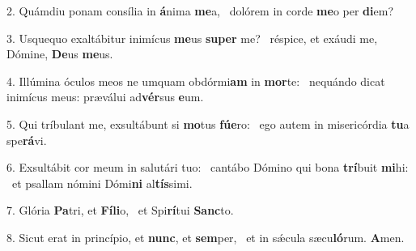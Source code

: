 2. Quámdiu ponam consília in \textbf{á}nima \textbf{me}a, \ast\  dolórem in corde \textbf{me}o per \textbf{di}em?\

3. Usquequo exaltábitur inimícus \textbf{me}us \textbf{su}\textbf{per} me? \ast\  réspice, et exáudi me, Dómine, \textbf{De}us \textbf{me}us.\

4. Illúmina óculos meos ne umquam obdórmi\textbf{am} in \textbf{mor}te: \ast\  nequándo dicat inimícus meus: præválui ad\textbf{vér}sus \textbf{e}um.\

5. Qui tríbulant me, exsultábunt si \textbf{mo}tus \textbf{fú}\textbf{e}ro: \ast\  ego autem in misericórdia \textbf{tu}a spe\textbf{rá}vi.\

6. Exsultábit cor meum in salutári tuo: \dag\  cantábo Dómino qui bona \textbf{trí}buit \textbf{mi}hi: \ast\  et psallam nómini Dómi\textbf{ni} al\textbf{tís}simi.\

7. Glória \textbf{Pa}tri, et \textbf{Fí}\textbf{li}o, \ast\  et Spi\textbf{rí}tui \textbf{Sanc}to.\

8. Sicut erat in princípio, et \textbf{nunc}, et \textbf{sem}per, \ast\  et in sǽcula sæcu\textbf{ló}rum. \textbf{A}men.\

